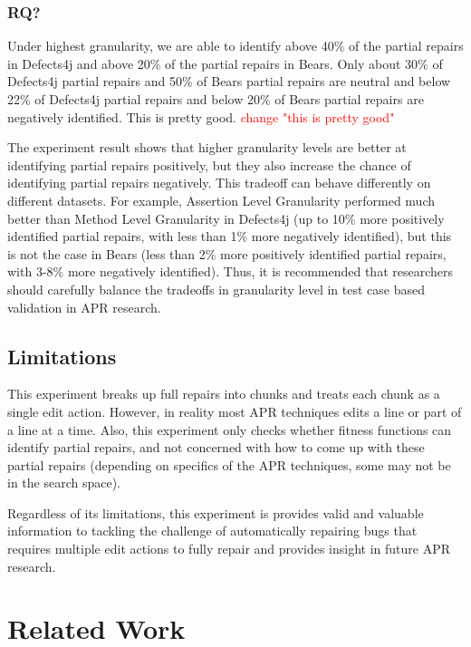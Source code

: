 \documentclass[sigconf, timestamp-false, anonymous=true]{acmart}
\newcommand\todo[1]{\textcolor{red}{#1}}
\begin{document}
\subsubsection{RQ?}

Under highest granularity, we are able to identify above 40\% of the partial repairs in Defects4j
and above 20\% of the partial repairs in Bears. Only about 30\% of Defects4j partial repairs and 50\%
of Bears partial repairs are neutral and below 22\% of Defects4j partial repairs and below 20\% 
of Bears partial repairs are negatively identified. This is pretty good. \todo{change "this is pretty good"}

The experiment result shows that higher granularity levels are better at identifying partial repairs positively, 
but they also increase the chance of identifying partial repairs negatively.
This tradeoff can behave differently on different datasets. For example,
Assertion Level Granularity performed much better than Method Level Granularity
in Defects4j (up to 10\% more positively identified partial repairs, with less than
1\% more negatively identified), but this is not the case in Bears (less than 2\%
more positively identified partial repairs, with 3-8\% more negatively identified).
Thus, it is recommended that researchers should 
carefully balance the tradeoffs in granularity level in test case based validation
in APR research.


\subsection{Limitations}

This experiment breaks up full repairs into chunks and treats each chunk as a 
single edit action. However, in reality most APR techniques edits a line or part 
of a line at a time. Also, this experiment only checks whether fitness functions 
can identify partial repairs, and not concerned with how to come up with these 
partial repairs (depending on specifics of the APR 
techniques, some may not be in the search space).

Regardless of its limitations, this experiment is provides valid and valuable 
information to tackling the challenge of automatically repairing bugs that 
requires multiple edit actions to fully repair 
and provides insight in future APR research.


\section{Related Work}
\end{document}
